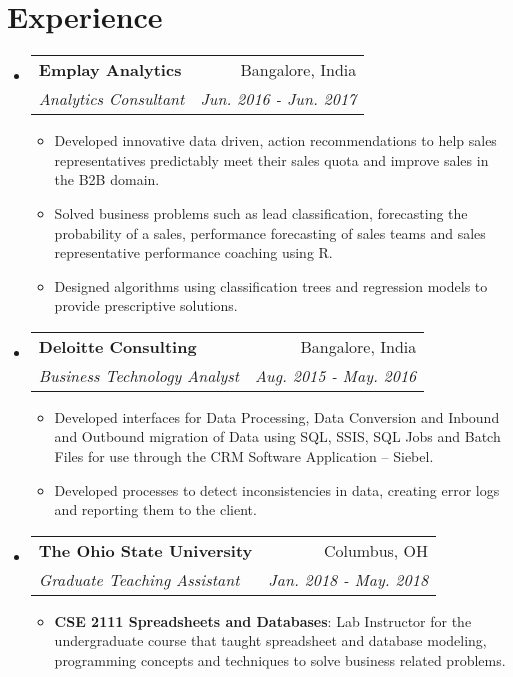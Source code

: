 \documentclass[letterpaper,11pt]{article}
\makeatletter
\newcommand{\resumeItem}[2]{
  \item\small{
    \textbf{#1}{: #2 \vspace{-2pt}}
  }
}
\newcommand{\resumeSubheading}[4]{
  \vspace{-1pt}\item
    \begin{tabular*}{0.97\textwidth}{l@{\extracolsep{\fill}}r}
      \textbf{#1} & #2 \\
      \textit{\small#3} & \textit{\small #4} \\
    \end{tabular*}\vspace{-5pt}
}
\newcommand{\resumeSubHeadingListStart}{\begin{itemize}[leftmargin=*]}
\newcommand{\resumeSubHeadingListEnd}{\end{itemize}}
\newcommand{\resumeItemListStart}{\begin{itemize}}
\newcommand{\resumeItemListEnd}{\end{itemize}\vspace{-5pt}}
\makeatother
\begin{document}
\section{Experience}
  \resumeSubHeadingListStart

    \resumeSubheading
      {Emplay Analytics}{Bangalore, India}
      {Analytics Consultant}{Jun. 2016 - Jun. 2017}
      \resumeItemListStart
	\item
          {Developed innovative data driven, action recommendations to help sales representatives predictably meet their sales
quota and improve sales in the B2B domain.}
        \item
{Solved business problems such as lead classification, forecasting the probability of a sales, performance forecasting of
sales teams and sales representative performance coaching using R.}
	\item
          {Designed algorithms using classification trees and regression models to provide prescriptive solutions.}
      \resumeItemListEnd



    \resumeSubheading
      {Deloitte Consulting}{Bangalore, India}
      {Business Technology Analyst}{Aug. 2015 - May. 2016}
      \resumeItemListStart
	\item
          {Developed interfaces for Data Processing, Data Conversion and Inbound and Outbound migration of Data using SQL,
SSIS, SQL Jobs and Batch Files for use through the CRM Software Application – Siebel.}
	\item
          {Developed processes to detect inconsistencies in data, creating error logs and reporting them to the client.}
      \resumeItemListEnd

    \resumeSubheading
      {The Ohio State University}{Columbus, OH}
      {Graduate Teaching Assistant}{Jan. 2018 - May. 2018}
      \resumeItemListStart
        \resumeItem{CSE 2111 Spreadsheets and Databases}
	{Lab Instructor for the undergraduate course that taught spreadsheet and database modeling, programming concepts and techniques to solve business related problems.}
      \resumeItemListEnd
 \resumeSubHeadingListEnd
\end{document}
